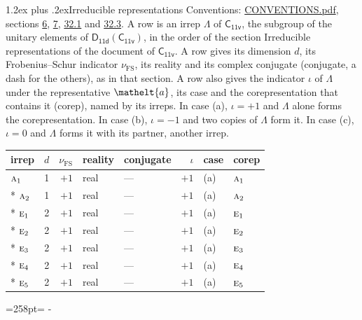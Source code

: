 \documentclass[10pt,a4paper]{article}
\makeatletter
\renewcommand\section{\@startsection{section}{1}{\z@}{-3ex plus -1ex minus -.2ex}%
  {1.2ex plus .2ex}{\normalfont\large\sffamily\bfseries\color{parttitle}}}
\newcommand{\needspace}[1]{\par\penalty-100\begingroup\dimen0=#1\relax\dimen2=\pagegoal
  \advance\dimen2-\pagetotal\ifdim\dimen0>\dimen2\relax\ifdim\dimen2>0pt\vfil\break\fi\fi
  \endgroup}
\numberwithin{equation}{section}
\newcommand{\eltfont}[1]{{\let\sigma\eltsigma\mathelt{#1}}}
\newcommand{\grp}[1]{\mathsf{#1}}
\newcommand{\irr}[1]{\text{\normalfont\scshape #1}}
\newcommand{\elt}[1]{\eltfont{#1}}
\newcommand{\fsind}{\nu_{\mathrm{FS}}}
\makeatother
\begin{document}
\section{Irreducible representations}\label{s:irreps}
Conventions: \href{../../CONVENTIONS.pdf}{CONVENTIONS.pdf}, sections \href{../../../rotation/CONVENTIONS.pdf\#conv.6}{6}, \href{../../../rotation/CONVENTIONS.pdf\#conv.7}{7}, \href{../../CONVENTIONS.pdf\#conv.32.1}{32.1} and \href{../../CONVENTIONS.pdf\#conv.32.3}{32.3}.
\leavevmode\label{n:irrep.Delta}A row is an irrep $\Lambda$ of $\grp{C_{11v}}$, the subgroup of the unitary elements of $\grp{D_{11d}}(\grp{C_{11v}})$, in the order of the section Irreducible representations of the document of \href{../../../rotation/data/pdf/C11v.pdf}{$\grp{C_{11v}}$}. \label{n:index.dimension}\label{n:index.frobenius}\label{n:head.irrep}\label{n:head.reality}\label{n:head.conjugate}A row gives its dimension $d$, its Frobenius--Schur indicator $\fsind$, its reality and its complex conjugate (conjugate, a dash for the others), as in that section. \label{n:head.case.corep}\label{n:head.corep}A row also gives the indicator $\iota$ of $\Lambda$ under the representative $\elt{a}$, its case and the corepresentation that contains it (corep), named by its irreps. In case (a), $\iota = +1$ and $\Lambda$ alone forms the corepresentation. In case (b), $\iota = -1$ and two copies of $\Lambda$ form it. In case (c), $\iota = 0$ and $\Lambda$ forms it with its partner, another irrep.
\setlength{\emergencystretch}{2em}\par\setlength{\emergencystretch}{0pt}
{\small\renewcommand{\arraystretch}{1.25}\setlength{\tabcolsep}{4pt}\begin{longtable}{@{}lrrllrll@{}}\toprule
irrep & $d$ & $\fsind$ & reality & conjugate & $\iota$ & case & corep\\\midrule\endhead
\bottomrule\endfoot\endlastfoot
$\irr{a}_{1}$ & 1 & $+1$ & real & --- & $+1$ & (a) & $\irr{a}_{1}$\\*
$\irr{a}_{2}$ & 1 & $+1$ & real & --- & $+1$ & (a) & $\irr{a}_{2}$\\*
$\irr{e}_{1}$ & 2 & $+1$ & real & --- & $+1$ & (a) & $\irr{e}_{1}$\\*
$\irr{e}_{2}$ & 2 & $+1$ & real & --- & $+1$ & (a) & $\irr{e}_{2}$\\*
$\irr{e}_{3}$ & 2 & $+1$ & real & --- & $+1$ & (a) & $\irr{e}_{3}$\\*
$\irr{e}_{4}$ & 2 & $+1$ & real & --- & $+1$ & (a) & $\irr{e}_{4}$\\*
$\irr{e}_{5}$ & 2 & $+1$ & real & --- & $+1$ & (a) & $\irr{e}_{5}$\\
\bottomrule\end{longtable}}
\needspace{258pt}
\end{document}

